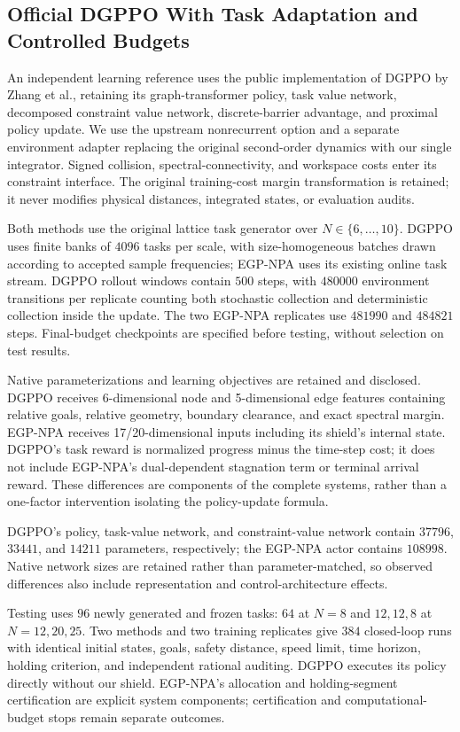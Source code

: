 \subsection{Official DGPPO With Task Adaptation and Controlled Budgets}\label{subsec:external}
An independent learning reference uses the public implementation of DGPPO by Zhang et al.\cite{zhang2025dgppo}, retaining its graph-transformer policy, task value network, decomposed constraint value network, discrete-barrier advantage, and proximal policy update. We use the upstream nonrecurrent option and a separate environment adapter replacing the original second-order dynamics with our single integrator. Signed collision, spectral-connectivity, and workspace costs enter its constraint interface. The original training-cost margin transformation is retained; it never modifies physical distances, integrated states, or evaluation audits.

Both methods use the original lattice task generator over $N\in\{6,\ldots,10\}$. DGPPO uses finite banks of $4096$ tasks per scale, with size-homogeneous batches drawn according to accepted sample frequencies; EGP-NPA uses its existing online task stream. DGPPO rollout windows contain $500$ steps, with $480000$ environment transitions per replicate counting both stochastic collection and deterministic collection inside the update. The two EGP-NPA replicates use $481990$ and $484821$ steps. Final-budget checkpoints are specified before testing, without selection on test results.

Native parameterizations and learning objectives are retained and disclosed. DGPPO receives 6-dimensional node and 5-dimensional edge features containing relative goals, relative geometry, boundary clearance, and exact spectral margin. EGP-NPA receives 17/20-dimensional inputs including its shield's internal state. DGPPO's task reward is normalized progress minus the time-step cost; it does not include EGP-NPA's dual-dependent stagnation term or terminal arrival reward. These differences are components of the complete systems, rather than a one-factor intervention isolating the policy-update formula.

DGPPO's policy, task-value network, and constraint-value network contain $37796$, $33441$, and $14211$ parameters, respectively; the EGP-NPA actor contains $108998$. Native network sizes are retained rather than parameter-matched, so observed differences also include representation and control-architecture effects.

Testing uses $96$ newly generated and frozen tasks: $64$ at $N=8$ and $12,12,8$ at $N=12,20,25$. Two methods and two training replicates give $384$ closed-loop runs with identical initial states, goals, safety distance, speed limit, time horizon, holding criterion, and independent rational auditing. DGPPO executes its policy directly without our shield. EGP-NPA's allocation and holding-segment certification are explicit system components; certification and computational-budget stops remain separate outcomes.

